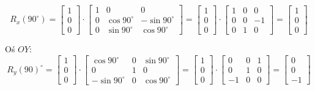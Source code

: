 \begin{przyklad}
\begin{equation*}
 R_{x}(90^{\circ}) = 
\begin{bmatrix}
    1 \\
    0 \\ 
    0
    \end{bmatrix}
    \cdot
    \begin{bmatrix}
     1 & 0 & 0 \\
    0 & \cos 90^{\circ} & -\sin90^{\circ} \\
    0 & \sin90^{\circ} & \cos90^{\circ} 
    \end{bmatrix}
    =
    \begin{bmatrix}
     1 \\
     0 \\
     0
    \end{bmatrix}
    \cdot
    \begin{bmatrix}
     1 & 0 & 0 \\
     0 & 0 & -1 \\
     0 & 1 & 0
    \end{bmatrix}
    =
    \begin{bmatrix}
     1 \\
     0 \\
     0
    \end{bmatrix}
\end{equation*}

Oś $OY$:
\begin{equation*}
    R_{y}(90)^{\circ} =
    \begin{bmatrix}
     1 \\
     0 \\
     0
    \end{bmatrix}
    \cdot
    \begin{bmatrix}
     \cos90^{\circ} & 0 & \sin90^{\circ} \\
    0 & 1 & 0  \\
    -\sin90^{\circ} & 0 & \cos90^{\circ}
    \end{bmatrix}
    =
    \begin{bmatrix}
     1 \\
     0 \\
     0
    \end{bmatrix}
    \cdot
    \begin{bmatrix}
     0 & 0 & 1 \\
     0 & 1 & 0 \\
     -1 & 0 & 0
    \end{bmatrix}
    =
    \begin{bmatrix}
     0 \\
     0 \\
     -1
    \end{bmatrix}
\end{equation*}
\end{przyklad}

